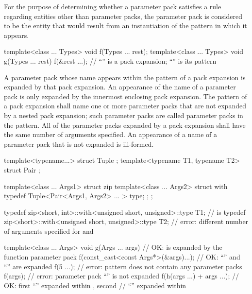 \pnum
For the purpose of determining whether a parameter pack satisfies a rule
regarding entities other than parameter packs, the parameter pack is
considered to be the entity that would result from an instantiation of
the pattern in which it appears.

\enterexample

\begin{codeblock}
template<class ... Types> void f(Types ... rest);
template<class ... Types> void g(Types ... rest) {
  f(&rest ...);     // ``'' is a pack expansion; ``'' is its pattern
}
\end{codeblock}

\exitexample

\pnum
A parameter pack whose name appears within the pattern of a pack
expansion is expanded by that pack expansion. An appearance of the name of
a parameter pack is only expanded by the innermost enclosing pack expansion.
The pattern of a pack expansion shall name one or more parameter packs that
are not expanded by a nested pack expansion; such parameter packs are called
 parameter packs in the pattern. All of the parameter packs expanded
by a pack expansion shall have the same number of arguments specified. An
appearance of a name of a parameter pack that is not expanded is
ill-formed. \enterexample

\begin{codeblock}
template<typename...> struct Tuple {};
template<typename T1, typename T2> struct Pair {};

template<class ... Args1> struct zip {
  template<class ... Args2> struct with {
    typedef Tuple<Pair<Args1, Args2> ... > type;
  };
};

typedef zip<short, int>::with<unsigned short, unsigned>::type T1;
    //  is 
typedef zip<short>::with<unsigned short, unsigned>::type T2;
    // error: different number of arguments specified for  and 

template<class ... Args>
  void g(Args ... args) {               // OK:  is expanded by the function parameter pack 
    f(const_cast<const Args*>(&args)...); // OK: ``'' and ``'' are expanded
    f(5 ...);                             // error: pattern does not contain any parameter packs
    f(args);                              // error: parameter pack ``'' is not expanded
    f(h(args ...) + args ...);            // OK: first ``'' expanded within , second
                                          // ``'' expanded within 
  }
\end{codeblock}

